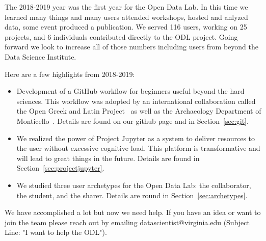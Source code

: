 The 2018-2019 year was the first year for the Open Data Lab. In this time we learned many things and many users attended workshops, hosted and anlyzed data, some event produced a publication. We served 116 users, working on 25 projects, and 6 individuals contributed directly to the ODL project. Going forward we look to increase all of those numbers including users from beyond the Data Science Institute.

Here are a few highlights from 2018-2019:
\begin{itemize}
\item Development of a GitHub workflow for beginners useful beyond the hard sciences. This workflow was adopted by an international collaboration called the Open Greek and Latin Project~\cite{ref:oglp} as well as the Archaeology Department of Monticello~\cite{ref:tjf}. Details are found on our github page and in Section~\ref{sec:git}.
\item We realized the power of Project Jupyter as a system to deliver resources to the user without excessive cognitive load. This platform is transformative and will lead to great things in the future. Details are found in Section~\ref{sec:projectjupyter}.
\item We studied three user archetypes for the Open Data Lab: the collaborator, the student, and the sharer. Details are round in Section~\ref{sec:archetypes}.
\end{itemize}

We have accomplished a lot but now we need help. If you have an idea or want to join the team please reach out by emailing datascientist@virginia.edu (Subject Line: "I want to help the ODL").

